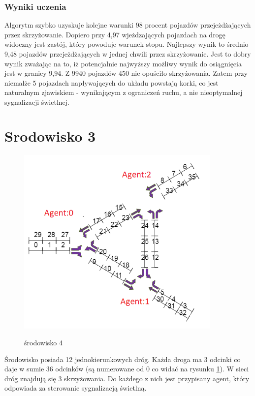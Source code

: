 \documentclass[12pt]{book}
\theoremstyle{plain}
\begin{document}
\subsubsection*{Wyniki uczenia}
Algorytm szybko uzyskuje kolejne warunki 98 procent pojazdów przejeżdżających przez skrzyżowanie. Dopiero przy 4,97 wjeżdzających pojazdach na drogę widoczny jest zastój, który powoduje warunek stopu.
Najlepszy wynik to średnio 9,48 pojazdów przejeżdżających w jednej chwili przez skrzyżowanie. Jest to dobry wynik zważając na to, iż potencjalnie najwyższy możliwy wynik do osiągnięcia jest w granicy 9,94. Z 9940 pojazdów 450 nie opuściło skrzyżowania. Zatem przy niemalże 5 pojazdach napływających do układu powstają korki, co jest naturalnym zjawiskiem - wynikającym z ograniczeń ruchu, a nie nieoptymalnej sygnalizacji świetlnej.

\section{Srodowisko 3}
\begin{figure}[H]
	\centering
	\includegraphics[width=10cm]{env_4_agenci}
	\label{fig:env_4_agenci}
	\caption{środowisko 4}
\end{figure}

Środowisko posiada 12 jednokierunkowych dróg. Każda droga ma 3 odcinki co daje w sumie 36 odcinków (są numerowane od 0 co widać na rysunku \ref{fig:env_4_agenci}).
W sieci dróg znajdują się 3 skrzyżowania. Do każdego z nich jest przypisany agent, który odpowiada za sterowanie sygnalizacją świetlną.
\end{document}
